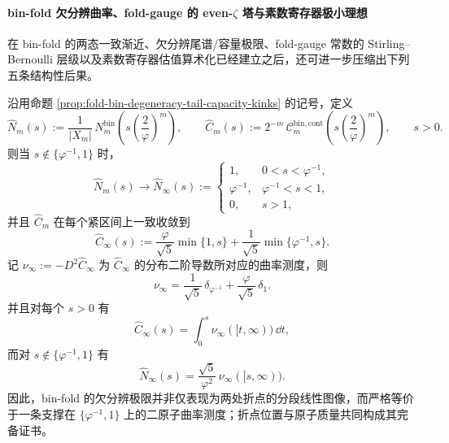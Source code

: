 \paragraph{bin-fold 欠分辨曲率、fold-gauge 的 even-\texorpdfstring{$\zeta$}{zeta} 塔与素数寄存器极小理想}
在 bin-fold 的两态一致渐近、欠分辨尾谱/容量极限、fold-gauge 常数的 Stirling--Bernoulli 层级以及素数寄存器估值算术化已经建立之后，还可进一步压缩出下列五条结构性后果。

\begin{theorem}\label{thm:xi-foldbin-underresolution-two-atomic-curvature-measure}
沿用命题 \ref{prop:fold-bin-degeneracy-tail-capacity-kinks} 的记号，定义
\[
\widehat N_m(s):=\frac{1}{|X_m|}\,N_m^{\mathrm{bin}}\!\left(s\left(\frac{2}{\varphi}\right)^m\right),
\qquad
\widehat C_m(s):=2^{-m}\,\mathcal C_m^{\mathrm{bin,cont}}\!\left(s\left(\frac{2}{\varphi}\right)^m\right),
\qquad s>0.
\]
则当 \(s\notin\{\varphi^{-1},1\}\) 时，
\[
\widehat N_m(s)\longrightarrow \widehat N_\infty(s):=
\begin{cases}
1,& 0<s<\varphi^{-1},\\[2pt]
\varphi^{-1},& \varphi^{-1}<s<1,\\[2pt]
0,& s>1,
\end{cases}
\]
并且 \(\widehat C_m\) 在每个紧区间上一致收敛到
\[
\widehat C_\infty(s):=\frac{\varphi}{\sqrt5}\min\{1,s\}+\frac{1}{\sqrt5}\min\{\varphi^{-1},s\}.
\]
记 \(\nu_\infty:=-D^2\widehat C_\infty\) 为 \(\widehat C_\infty\) 的分布二阶导数所对应的曲率测度，则
\[
\boxed{\;
\nu_\infty=
\frac{1}{\sqrt5}\,\delta_{\varphi^{-1}}+\frac{\varphi}{\sqrt5}\,\delta_{1}.
\;}
\]
并且对每个 \(s>0\) 有
\[
\boxed{\;
\widehat C_\infty(s)=\int_0^s \nu_\infty([t,\infty))\,\dd t,
\;}
\]
而对 \(s\notin\{\varphi^{-1},1\}\) 有
\[
\boxed{\;
\widehat N_\infty(s)=\frac{\sqrt5}{\varphi^2}\,\nu_\infty([s,\infty)).
\;}
\]
因此，bin-fold 的欠分辨极限并非仅表现为两处折点的分段线性图像，而严格等价于一条支撑在 \(\{\varphi^{-1},1\}\) 上的二原子曲率测度；折点位置与原子质量共同构成其完备证书。
\end{theorem}
